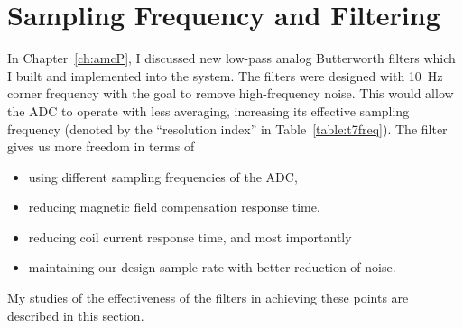 \section{Sampling Frequency and Filtering}\label{sec:freq}


In Chapter~\ref{ch:amcP}, I discussed new low-pass analog Butterworth
filters which I built and implemented into the system.  The filters
were designed with 10~Hz corner frequency with the goal to remove
high-frequency noise.  This would allow the ADC to operate with less
averaging, increasing its effective sampling frequency (denoted by the
``resolution index'' in Table~\ref{table:t7freq}).  The filter gives
us more freedom in terms of
\begin{itemize}
    \item using different sampling frequencies of the ADC,
    \item reducing magnetic field compensation response time,
    \item reducing coil current response time, and most importantly
    \item maintaining our design sample rate with better reduction of noise.
\end{itemize}
My studies of the effectiveness of the filters in achieving these
points are described in this section.




